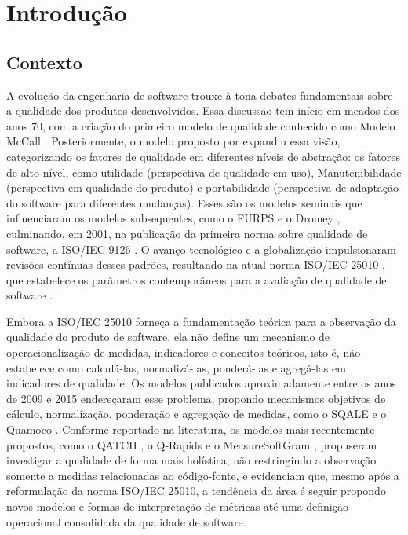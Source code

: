 
\chapter[Introdução]{Introdução}


\section{Contexto}



A evolução da engenharia de software trouxe à tona debates fundamentais sobre a qualidade dos produtos desenvolvidos. Essa discussão tem início em meados dos anos 70, com a criação do primeiro modelo de qualidade conhecido como Modelo McCall \cite{mccall1977factors}. Posteriormente, o modelo proposto por  expandiu essa visão, categorizando os fatores de qualidade em diferentes níveis de abstração: os fatores de alto nível, como utilidade (perspectiva de qualidade em uso), Manutenibilidade (perspectiva em qualidade do produto) e portabilidade (perspectiva de adaptação do software para diferentes mudanças). Esses são os modelos seminais que influenciaram os modelos subsequentes, como o FURPS \cite{grady1987software} e o Dromey \cite{dromey1995model}, culminando, em 2001, na publicação da primeira norma sobre qualidade de software, a ISO/IEC 9126 \cite{ISO9126}. O avanço tecnológico e a globalização impulsionaram revisões contínuas desses padrões, resultando na atual norma ISO/IEC 25010 \cite{iso25010}, que estabelece os parâmetros contemporâneos para a avaliação de qualidade de software \cite{miguel2014review}.

Embora a ISO/IEC 25010 forneça a fundamentação teórica para a observação da qualidade do produto de software, ela não define um mecanismo de operacionalização de medidas, indicadores e conceitos teóricos, isto é, não estabelece como calculá-las, normalizá-las, ponderá-las e agregá-las em indicadores de qualidade. Os modelos publicados aproximadamente entre os anos de 2009 e 2015 endereçaram esse problema, propondo mecanismos objetivos de cálculo, normalização, ponderação e agregação de medidas, como o SQALE \cite{letouzey2010} e o Quamoco \cite{wagner2012quamoco}. Conforme reportado na literatura, os modelos mais recentemente propostos, como o QATCH \cite{siavvas2017qatch}, o Q-Rapids \cite{qrapids2019} e o MeasureSoftGram \cite{neri2020}, propuseram investigar a qualidade de forma mais holística, não restringindo a observação somente a medidas relacionadas ao código-fonte, e evidenciam que, mesmo após a reformulação da norma ISO/IEC 25010, a tendência da área é seguir propondo novos modelos e formas de interpretação de métricas até uma definição operacional consolidada da qualidade de software.


